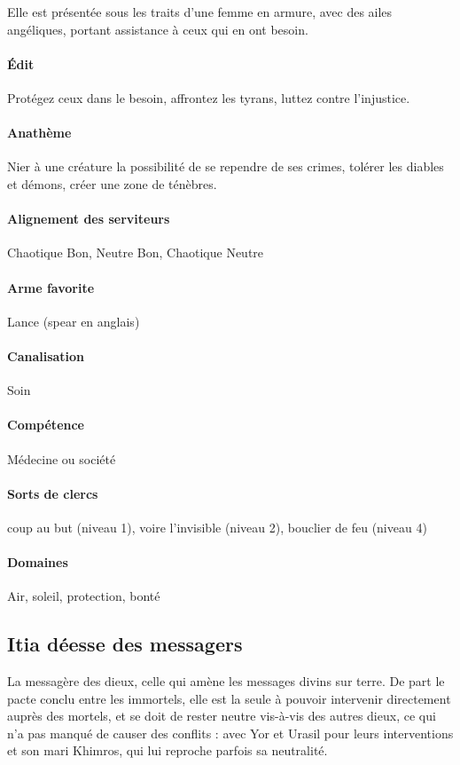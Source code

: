 \documentclass[10pt,a4paper]{book}
\begin{document}
Elle est présentée sous les traits d'une femme en armure, avec des ailes angéliques, portant assistance à ceux qui en ont besoin.
\paragraph{Édit} Protégez ceux dans le besoin, affrontez les tyrans, luttez contre l'injustice.
\paragraph{Anathème} Nier à une créature la possibilité de se rependre de ses crimes, tolérer les diables et démons, créer une zone de ténèbres.
\paragraph{Alignement des serviteurs} Chaotique Bon, Neutre Bon, Chaotique Neutre
\paragraph{Arme favorite }Lance (spear en anglais)
\paragraph{Canalisation} Soin
\paragraph{Compétence} Médecine ou société
\paragraph{Sorts de clercs}coup au but (niveau 1), voire l'invisible (niveau 2), bouclier de feu (niveau 4)
\paragraph{Domaines }Air, soleil, protection, bonté
\subsection{Itia déesse des messagers}
La messagère des dieux, celle qui amène les messages divins sur terre. De part le pacte conclu entre les immortels, elle est la seule à pouvoir intervenir directement auprès des mortels, et se doit de rester neutre vis-à-vis des autres dieux, ce qui n'a pas manqué de causer des conflits : avec Yor et Urasil pour leurs interventions et son mari Khimros, qui lui reproche parfois sa neutralité.
\end{document}
